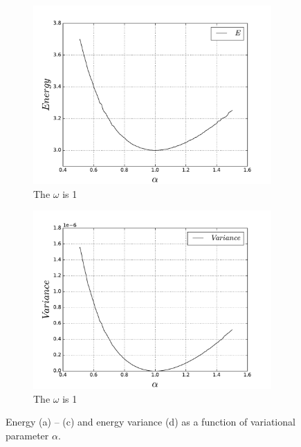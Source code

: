 \documentclass[10pt]{article}
\begin{document}
\begin{figure}[h!]
\begin{subfigure}[b]{0.55\linewidth}
    \includegraphics[width=0.9\linewidth]{energy_on_alpha_1} 
    \caption{The $\omega$ is 1} 
    \label{fig1:c} 
  \end{subfigure}%
  \begin{subfigure}[b]{0.55\linewidth}
    \centering
    \includegraphics[width=0.9\linewidth]{variance_on_alpha} 
    \caption{The $\omega$ is 1} 
    \label{fig:d} 
  \end{subfigure} 
  \caption{ Energy (a) -- (c) and energy variance (d) as a function of variational parameter $\alpha$.}
  \label{fig1} 
\end{figure}
\end{document}
